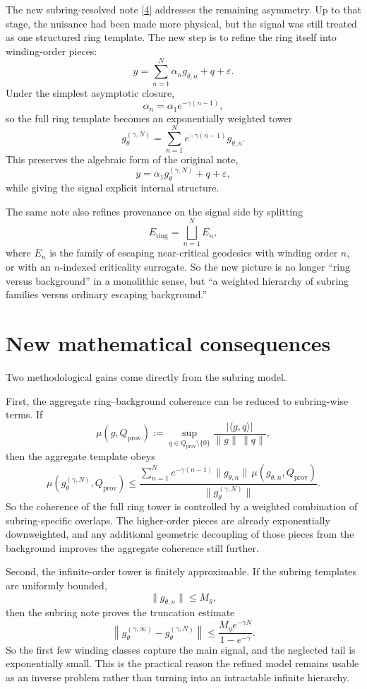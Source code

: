 \documentclass[10pt,letterpaper,twocolumn]{article}
\begin{document}
The new subring-resolved note [\hyperlink{ref-4}{4}] addresses the remaining asymmetry. Up to that stage, the nuisance had been made more physical, but the signal was still treated as one structured ring template. The new step is to refine the ring itself into winding-order pieces:
\[
y = \sum_{n=1}^{N} \alpha_n g_{\theta,n} + q + \varepsilon.
\]
Under the simplest asymptotic closure,
\[
\alpha_n = \alpha_1 e^{-\gamma(n-1)},
\]
so the full ring template becomes an exponentially weighted tower
\[
g_\theta^{(\gamma,N)} = \sum_{n=1}^{N} e^{-\gamma(n-1)} g_{\theta,n}.
\]
This preserves the algebraic form of the original note,
\[
y = \alpha_1 g_\theta^{(\gamma,N)} + q + \varepsilon,
\]
while giving the signal explicit internal structure.

The same note also refines provenance on the signal side by splitting
\[
E_{\mathrm{ring}} = \bigsqcup_{n=1}^{N} E_n,
\]
where $E_n$ is the family of escaping near-critical geodesics with winding order $n$, or with an $n$-indexed criticality surrogate. So the new picture is no longer “ring versus background” in a monolithic sense, but “a weighted hierarchy of subring families versus ordinary escaping background.”

\section{New mathematical consequences}

Two methodological gains come directly from the subring model.

First, the aggregate ring--background coherence can be reduced to subring-wise terms. If
\[
\mu(g,Q_{\mathrm{prov}})
:=
\sup_{q\in Q_{\mathrm{prov}}\setminus\{0\}}
\frac{|\langle g,q\rangle|}{\|g\|\,\|q\|},
\]
then the aggregate template obeys
\[
\mu\!\left(g_\theta^{(\gamma,N)},Q_{\mathrm{prov}}\right)
\le
\frac{\sum_{n=1}^{N} e^{-\gamma(n-1)}\|g_{\theta,n}\|\,\mu(g_{\theta,n},Q_{\mathrm{prov}})}{\|g_\theta^{(\gamma,N)}\|}.
\]
So the coherence of the full ring tower is controlled by a weighted combination of subring-specific overlaps. The higher-order pieces are already exponentially downweighted, and any additional geometric decoupling of those pieces from the background improves the aggregate coherence still further.

Second, the infinite-order tower is finitely approximable. If the subring templates are uniformly bounded,
\[
\|g_{\theta,n}\|\le M_g,
\]
then the subring note proves the truncation estimate
\[
\left\|g_\theta^{(\gamma,\infty)} - g_\theta^{(\gamma,N)}\right\|
\le
\frac{M_g e^{-\gamma N}}{1-e^{-\gamma}}.
\]
So the first few winding classes capture the main signal, and the neglected tail is exponentially small. This is the practical reason the refined model remains usable as an inverse problem rather than turning into an intractable infinite hierarchy.
\end{document}
